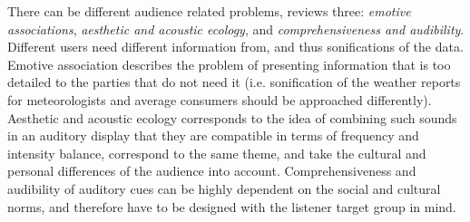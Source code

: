There can be different audience related problems, \cite{hermann_sonification_2011} reviews three: \textit{emotive associations}, \textit{aesthetic and acoustic ecology}, and \textit{comprehensiveness and audibility}. Different users need different information from, and thus sonifications of the data. Emotive association describes the problem of presenting information that is too detailed to the parties that do not need it (i.e. sonification of the weather reports for meteorologists and average consumers should be approached differently). Aesthetic and acoustic ecology corresponds to the idea of combining such sounds in an auditory display that they are compatible in terms of frequency and intensity balance, correspond to the same theme, and take the cultural and personal differences of the audience into account. Comprehensiveness and audibility of auditory cues can be highly dependent on the social and cultural norms, and therefore have to be designed with the listener target group in mind.

\paragraph[Earcons and Auditory icons]{}

\paragraph[Bridge]{}


